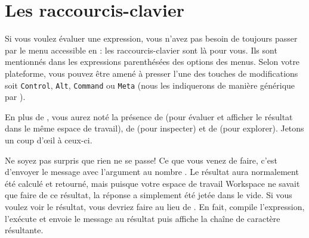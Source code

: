 \documentclass[a4paper,10pt,twoside]{book}
\begin{document}

\section{Les raccourcis-clavier}

Si vous voulez évaluer une expression, vous n'avez pas besoin de
toujours passer par le menu accessible en \actclickant: les
raccourcis-clavier sont là pour vous. Ils sont mentionnés
dans les expressions parenthésées des options des menus. Selon
votre plateforme, vous pouvez être amené à presser l'une des
touches de modifications soit \texttt{Control}, \texttt{Alt},
\texttt{Command} ou \texttt{Meta} (nous les indiquerons de manière
générique par ).

En plus de , vous aurez noté la présence de  
(pour évaluer et afficher le résultat dans le même espace de travail), 
de  (pour inspecter) et de  (pour
explorer). Jetons un coup d'\oe il à ceux-ci.


Ne soyez pas surpris que rien ne se passe!
Ce que vous venez de faire, c'est d'envoyer le message \ct{+} avec
l'argument  au nombre . Le résultat  aura
normalement été calculé et retourné, mais puisque votre espace de
travail Workspace ne savait que faire de ce résultat, la réponse a
simplement été jetée dans le vide. Si vous voulez voir le
résultat, vous devriez faire  au lieu
de . En fait,  compile l'expression,
l'exécute et envoie le message  au résultat puis
affiche la chaîne de caractère résultante.
\end{document}
